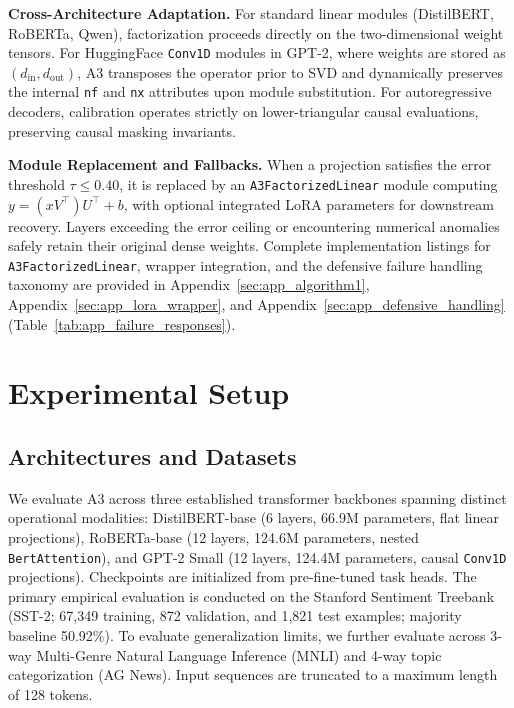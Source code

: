 \textbf{Cross-Architecture Adaptation.} For standard linear modules (DistilBERT, RoBERTa, Qwen), factorization proceeds directly on the two-dimensional weight tensors. For HuggingFace \texttt{Conv1D} modules in GPT-2, where weights are stored as $(d_\text{in}, d_\text{out})$, A3 transposes the operator prior to SVD and dynamically preserves the internal \texttt{nf} and \texttt{nx} attributes upon module substitution. For autoregressive decoders, calibration operates strictly on lower-triangular causal evaluations, preserving causal masking invariants.

\textbf{Module Replacement and Fallbacks.} When a projection satisfies the error threshold $\tau \le 0.40$, it is replaced by an \texttt{A3FactorizedLinear} module computing $y = (x V^\top) U^\top + b$, with optional integrated LoRA parameters for downstream recovery. Layers exceeding the error ceiling or encountering numerical anomalies safely retain their original dense weights. Complete implementation listings for \texttt{A3FactorizedLinear}, wrapper integration, and the defensive failure handling taxonomy are provided in Appendix~\ref{sec:app_algorithm1}, Appendix~\ref{sec:app_lora_wrapper}, and Appendix~\ref{sec:app_defensive_handling} (Table~\ref{tab:app_failure_responses}).


\section{Experimental Setup}
\label{sec:setup}

\subsection{Architectures and Datasets}

We evaluate A3 across three established transformer backbones spanning distinct operational modalities: DistilBERT-base (6 layers, 66.9M parameters, flat linear projections), RoBERTa-base (12 layers, 124.6M parameters, nested \texttt{BertAttention}), and GPT-2 Small (12 layers, 124.4M parameters, causal \texttt{Conv1D} projections). Checkpoints are initialized from pre-fine-tuned task heads. The primary empirical evaluation is conducted on the Stanford Sentiment Treebank (SST-2; 67,349 training, 872 validation, and 1,821 test examples; majority baseline 50.92\%). To evaluate generalization limits, we further evaluate across 3-way Multi-Genre Natural Language Inference (MNLI) and 4-way topic categorization (AG News). Input sequences are truncated to a maximum length of 128 tokens.

